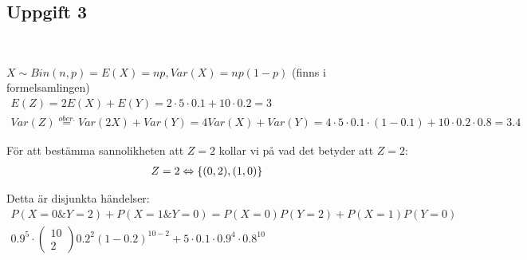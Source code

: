 \subsection{Uppgift 3}\hfill\\\par
\noindent $X\sim Bin(n,p) = E(X) = np, Var(X) = np(1-p)$ (finns i formelsamlingen)
\begin{equation*}
  \begin{gathered}
    E(Z) = 2E(X) + E(Y) = 2\cdot5\cdot0.1+10\cdot0.2 = 3\\
    Var(Z) \stackrel{ober.}{=} Var(2X)+Var(Y) = 4Var(X)+Var(Y)=4\cdot5\cdot0.1\cdot(1-0.1)+10\cdot0.2\cdot0.8 = 3.4
  \end{gathered}
\end{equation*}
\par\bigskip
\noindent För att bestämma sannolikheten att $Z=2$ kollar vi på vad det betyder att $Z=2$:
\begin{equation*}
  \begin{gathered}
    Z=2 \Leftrightarrow \left\{(0,2),(1,0)\right\}
  \end{gathered}
\end{equation*}\par
\noindent Detta är disjunkta händelser:
\begin{equation*}
  \begin{gathered}
    P(X=0\& Y=2)+P(X=1\&Y=0) = P(X=0)P(Y=2)+P(X=1)P(Y=0)\\
    0.9^5\cdot\begin{pmatrix}10\\2\end{pmatrix}0.2^2(1-0.2)^{10-2}+5\cdot0.1\cdot0.9^4\cdot0.8^{10}
  \end{gathered}
\end{equation*}
\par\bigskip
